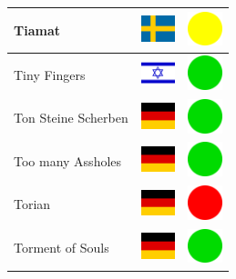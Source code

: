 \documentclass[12pt, a4paper, twoside]{report}
\begin{document}
\begin{center}
\begin{longtable}{|p{5cm}|p{2cm}|p{2cm}|}
 Tiamat                                                     & \includegraphics[width=1cm]{../img/flags/se} &   \includegraphics[width=1cm]{../likes/m} \\ \hline
 Tiny Fingers                                               & \includegraphics[width=1cm]{../img/flags/il} &   \includegraphics[width=1cm]{../likes/y} \\ \hline
 Ton Steine Scherben                                        & \includegraphics[width=1cm]{../img/flags/de} &   \includegraphics[width=1cm]{../likes/y} \\ \hline
 Too many Assholes                                          & \includegraphics[width=1cm]{../img/flags/de} &   \includegraphics[width=1cm]{../likes/y} \\ \hline
 Torian                                                     & \includegraphics[width=1cm]{../img/flags/de} &   \includegraphics[width=1cm]{../likes/n} \\ \hline
 Torment of Souls                                           & \includegraphics[width=1cm]{../img/flags/de} &   \includegraphics[width=1cm]{../likes/y} \\ \hline

\end{longtable}
\end{center}
\end{document}
